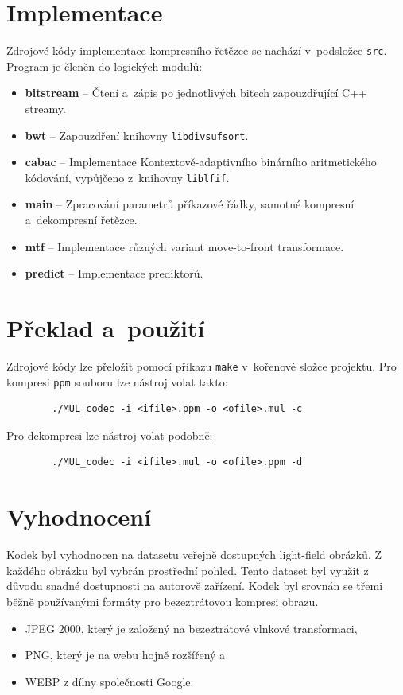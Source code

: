 \documentclass[a4paper, 11pt, titlepage]{article}
\begin{document}
	\section*{Implementace}
	Zdrojové kódy implementace kompresního řetězce se nachází v~podsložce \texttt{src}.
	Program je členěn do logických modulů:
	\begin{itemize}
		\item \textbf{bitstream} -- Čtení a~zápis po jednotlivých bitech zapouzdřující C++ streamy.
		\item \textbf{bwt} -- Zapouzdření knihovny \texttt{libdivsufsort}.
		\item \textbf{cabac} -- Implementace Kontextově-adaptivního binárního aritmetického kódování, vypůjčeno z~knihovny \texttt{liblfif}.
		\item \textbf{main} -- Zpracování parametrů příkazové řádky, samotné kompresní a~dekompresní řetězce.
		\item \textbf{mtf} -- Implementace různých variant move-to-front transformace.
		\item \textbf{predict} -- Implementace prediktorů.
	\end{itemize}

	\section*{Překlad a~použití}
	Zdrojové kódy lze přeložit pomocí příkazu \texttt{make} v~kořenové složce projektu.
	Pro kompresi \texttt{ppm} souboru lze nástroj volat takto:
	\begin{verbatim}
		./MUL_codec -i <ifile>.ppm -o <ofile>.mul -c
	\end{verbatim}
	Pro dekompresi lze nástroj volat podobně:
	\begin{verbatim}
		./MUL_codec -i <ifile>.mul -o <ofile>.ppm -d
	\end{verbatim}

  \section*{Vyhodnocení}
	Kodek byl vyhodnocen na datasetu veřejně dostupných light-field obrázků.
	Z každého obrázku byl vybrán prostřední pohled.
	Tento dataset byl využit z důvodu snadné dostupnosti na autorově zařízení.
	Kodek byl srovnán se třemi běžně používanými formáty pro bezeztrátovou kompresi obrazu.
	\begin{itemize}
		\item JPEG 2000, který je založený na bezeztrátové vlnkové transformaci,
		\item PNG, který je na webu hojně rozšířený a
		\item WEBP z dílny společnosti Google.
	\end{itemize}
\end{document}
